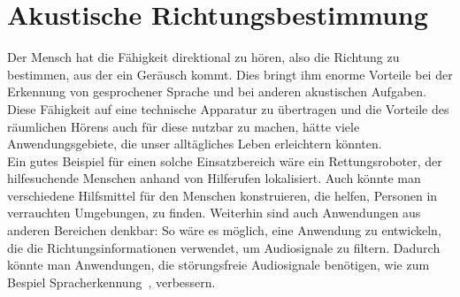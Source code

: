 \section{Akustische Richtungsbestimmung}
Der Mensch hat die Fähigkeit direktional zu hören, also die Richtung zu bestimmen, aus der ein Geräusch kommt. Dies bringt ihm enorme Vorteile bei der Erkennung von gesprochener Sprache und bei anderen akustischen Aufgaben. Diese Fähigkeit auf eine technische Apparatur zu übertragen und die Vorteile des räumlichen Hörens auch für diese nutzbar zu machen, hätte viele Anwendungsgebiete, die unser alltägliches Leben erleichtern könnten.\\
Ein gutes Beispiel für einen solche Einsatzbereich wäre ein Rettungsroboter, der hilfesuchende Menschen anhand von Hilferufen lokalisiert. Auch könnte man verschiedene Hilfsmittel für den Menschen konstruieren, die helfen, Personen in verrauchten Umgebungen, zu finden.
Weiterhin sind auch Anwendungen aus anderen Bereichen denkbar: So wäre es möglich, eine Anwendung zu entwickeln, die die Richtungsinformationen verwendet, um Audiosignale zu filtern. Dadurch könnte man Anwendungen, die störungsfreie Audiosignale benötigen, wie zum Bespiel Spracherkennung~\cite{Spracherkennung}, verbessern.
